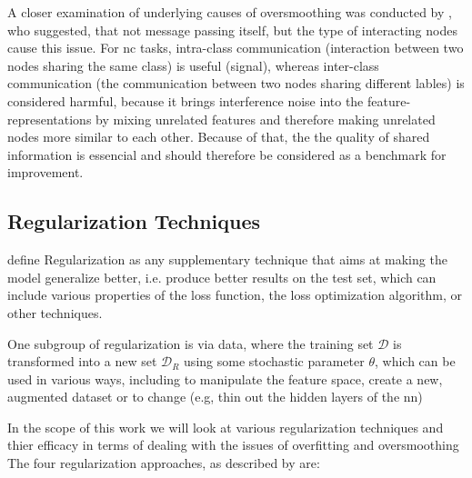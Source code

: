 A closer examination of underlying causes of oversmoothing was conducted by \cite{Chen2020},
who suggested, that not message passing itself, but the type of interacting nodes cause this issue.
For \acf{nc} tasks, intra-class communication (interaction between two nodes sharing the same class)
is useful (signal), whereas inter-class communication (the communication between two nodes sharing
different lables) is considered harmful, because it brings interference noise into the
feature-representations by mixing unrelated features and therefore making unrelated nodes more similar
to each other. Because of that, the the quality of shared information is essencial and should
therefore be considered as a benchmark for improvement.





\subsection{Regularization Techniques}
\label{sec:related:pred:regularization}

\cite{Kukacka2017} define Regularization as any supplementary technique that aims at making the
model generalize better, i.e. produce better results on the test set, which can include various
properties of the loss function, the loss optimization algorithm, or
other techniques.


One subgroup of regularization is via data, where the training set $\mathcal{D}$ is
transformed into a new set $\mathcal{D}_{R}$ using some stochastic parameter
$\theta$, which can be used in various ways, including to manipulate the feature space,
create a new, augmented dataset or to change (e.g, thin out the hidden layers of
the \ac{nn})


In the scope of this work we will look at various regularization techniques
and thier efficacy in terms of dealing with the issues of overfitting and oversmoothing
The four regularization approaches, as described by \cite{DBLP:journals/corr/abs-2006-04064} are:

